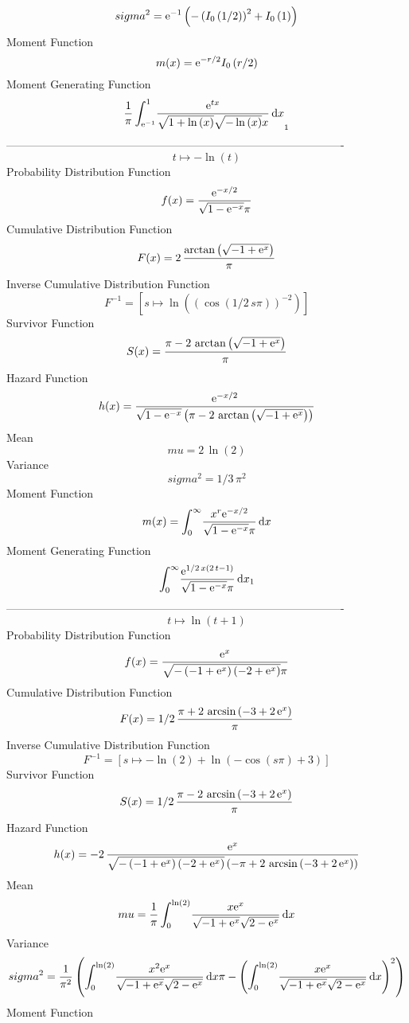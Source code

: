 \documentclass[12pt]{article}
\begin{document}
 $$ sigma^2 = {{\rm e}^{-1}} \left( - \left( {{\sl I}_{0}\left(1/2\right)} \right) ^
{2}+{{\sl I}_{0}\left(1\right)} \right) 
$$ Moment Function 
 $$ m(x) = {{\rm e}^{-r/2}}{{\sl I}_{0}\left(r/2\right)}
$$ Moment Generating Function 
 $${\frac {1}{\pi}\int_{{{\rm e}^{-1}}}^{1}\!{\frac {{{\rm e}^{tx}}}{
\sqrt {1+\ln  \left( x \right) }\sqrt {-\ln  \left( x \right) }x}}
\,{\rm d}x}_{{1}}
$$-------------------------------------------------------------------------------------------  \\$$t\mapsto -\ln  \left( t \right) 
$$Probability Distribution Function 
$$  f(x)={\frac {{{\rm e}^{-x/2}}}{\sqrt {1-{{\rm e}^{-x}}}\pi}}
$$Cumulative Distribution Function  
 $$F(x)=2\,{\frac {\arctan \left( \sqrt {-1+{{\rm e}^{x}}} \right) }{\pi}}
$$ Inverse Cumulative Distribution Function 
  $$F^{-1} = [s\mapsto \ln  \left(  \left( \cos \left( 1/2\,s\pi \right)  \right) ^
{-2} \right) ]
$$Survivor Function 
 $$ S(x)={\frac {\pi-2\,\arctan \left( \sqrt {-1+{{\rm e}^{x}}} \right) }{\pi}}
$$ Hazard Function 
 $$ h(x)={\frac {{{\rm e}^{-x/2}}}{\sqrt {1-{{\rm e}^{-x}}} \left( \pi-2\,
\arctan \left( \sqrt {-1+{{\rm e}^{x}}} \right)  \right) }}
$$ Mean 
 $$ mu=2\,\ln  \left( 2 \right) 
$$ Variance 
 $$ sigma^2 = 1/3\,{\pi}^{2}
$$ Moment Function 
 $$ m(x) = \int_{0}^{\infty }\!{\frac {{x}^{r}{{\rm e}^{-x/2}}}{\sqrt {1-{{\rm e}
^{-x}}}\pi}}\,{\rm d}x
$$ Moment Generating Function 
 $$\int_{0}^{\infty }\!{\frac {{{\rm e}^{1/2\,x \left( 2\,t-1 \right) }}
}{\sqrt {1-{{\rm e}^{-x}}}\pi}}\,{\rm d}x_{{1}}
$$-------------------------------------------------------------------------------------------  \\$$t\mapsto \ln  \left( t+1 \right) 
$$Probability Distribution Function 
$$  f(x)={\frac {{{\rm e}^{x}}}{\sqrt {- \left( -1+{{\rm e}^{x}} \right) 
 \left( -2+{{\rm e}^{x}} \right) }\pi}}
$$Cumulative Distribution Function  
 $$F(x)=1/2\,{\frac {\pi+2\,\arcsin \left( -3+2\,{{\rm e}^{x}} \right) }{\pi}}
$$ Inverse Cumulative Distribution Function 
  $$F^{-1} = [s\mapsto -\ln  \left( 2 \right) +\ln  \left( -\cos \left( s\pi
 \right) +3 \right) ]
$$Survivor Function 
 $$ S(x)=1/2\,{\frac {\pi-2\,\arcsin \left( -3+2\,{{\rm e}^{x}} \right) }{\pi}}
$$ Hazard Function 
 $$ h(x)=-2\,{\frac {{{\rm e}^{x}}}{\sqrt {- \left( -1+{{\rm e}^{x}} \right) 
 \left( -2+{{\rm e}^{x}} \right) } \left( -\pi+2\,\arcsin \left( -3+2
\,{{\rm e}^{x}} \right)  \right) }}
$$ Mean 
 $$ mu={\frac {1}{\pi}\int_{0}^{\ln  \left( 2 \right) }\!{\frac {x{{\rm e}^{x
}}}{\sqrt {-1+{{\rm e}^{x}}}\sqrt {2-{{\rm e}^{x}}}}}\,{\rm d}x}
$$ Variance 
 $$ sigma^2 = {\frac {1}{{\pi}^{2}} \left( \int_{0}^{\ln  \left( 2 \right) }\!{
\frac {{x}^{2}{{\rm e}^{x}}}{\sqrt {-1+{{\rm e}^{x}}}\sqrt {2-{{\rm e}
^{x}}}}}\,{\rm d}x\pi- \left( \int_{0}^{\ln  \left( 2 \right) }\!{
\frac {x{{\rm e}^{x}}}{\sqrt {-1+{{\rm e}^{x}}}\sqrt {2-{{\rm e}^{x}}}
}}\,{\rm d}x \right) ^{2} \right) }
$$ Moment Function 
\end{document}
